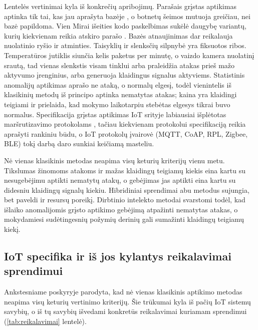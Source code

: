 Lentelės vertinimai kyla iš konkrečių apribojimų. Parašais grįstas
aptikimas aptinka tik tai, kas jau aprašyta bazėje
\cite{komal2026idsreview}, o botnetų šeimos mutuoja greičiau, nei bazė
papildoma. Vien Mirai išeities kodo paskelbimas sukėlė daugybę variantų,
kurių kiekvienam reikia atskiro parašo \cite{antonakakis2017mirai}. Bazės
atnaujinimas dar reikalauja nuolatinio ryšio ir atminties. Taisyklių ir
slenksčių silpnybė yra fiksuotos ribos. Temperatūros jutiklis siunčia
kelis paketus per minutę, o vaizdo kamera nuolatinį srautą, tad vienas
slenkstis visam tinklui arba praleidžia atakas prieš mažo aktyvumo
įrenginius, arba generuoja klaidingus signalus aktyviems. Statistinis
anomalijų aptikimas aprašo ne ataką, o normalų elgesį, todėl vienintelis
iš klasikinių metodų iš principo aptinka nematytas atakas; kaina yra
klaidingi teigiami ir prielaida, kad mokymo laikotarpiu stebėtas elgesys
tikrai buvo normalus. Specifikacija grįstas aptikimas IoT srityje
labiausiai išplėtotas maršrutizavimo protokolams
\cite{prajapati2025rpl}, tačiau kiekvienam protokolui specifikaciją
reikia aprašyti rankiniu būdu, o IoT protokolų įvairovė (MQTT, CoAP,
RPL, Zigbee, BLE) tokį darbą daro sunkiai keičiamą masteliu.

Nė vienas klasikinis metodas neapima visų keturių kriterijų vienu metu.
Tikslumas žinomoms atakoms ir mažas klaidingų teigiamų kiekis eina kartu
su nesugebėjimu aptikti nematytų atakų, o gebėjimas jas aptikti eina
kartu su didesniu klaidingų signalų kiekiu. Hibridiniai sprendimai abu
metodus sujungia, bet paveldi ir resursų poreikį. Dirbtinio intelekto
metodai svarstomi todėl, kad išlaiko anomalijomis grįsto aptikimo
gebėjimą atpažinti nematytas atakas, o mokydamiesi sudėtingesnių požymių
derinių gali sumažinti klaidingų teigiamų kiekį.

\subsection{IoT specifika ir iš jos kylantys reikalavimai sprendimui}
\label{sec:specifika}
Ankstesniame poskyryje parodyta, kad nė vienas klasikinis aptikimo
metodas neapima visų keturių vertinimo kriterijų. Šie trūkumai kyla iš
pačių IoT sistemų savybių, o iš tų savybių išvedami konkretūs
reikalavimai kuriamam sprendimui (\ref{tab:reikalavimai} lentelė).

